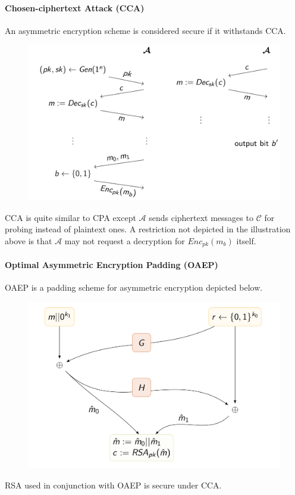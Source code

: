 \paragraph{Chosen-ciphertext Attack (CCA)}
An asymmetric encryption scheme is considered secure if it withstands CCA.
\begin{figure}[H]
  \centering
  \includegraphics[width=.8\textwidth]{figures/cca.png}
\end{figure}
CCA is quite similar to CPA except $\mathcal{A}$ sends ciphertext messages to $\mathcal{C}$ for probing instead of plaintext ones.
A restriction not depicted in the illustration above is that $\mathcal{A}$ may not request a decryption for $Enc_{pk}(m_b)$ itself.

\paragraph{Optimal Asymmetric Encryption Padding (OAEP)}
OAEP is a padding scheme for asymmetric encryption depicted below.
\begin{figure}[H]
  \centering
  \includegraphics[width=.7\textwidth]{figures/oaep.png}
\end{figure}

RSA used in conjunction with OAEP is secure under CCA\@.

